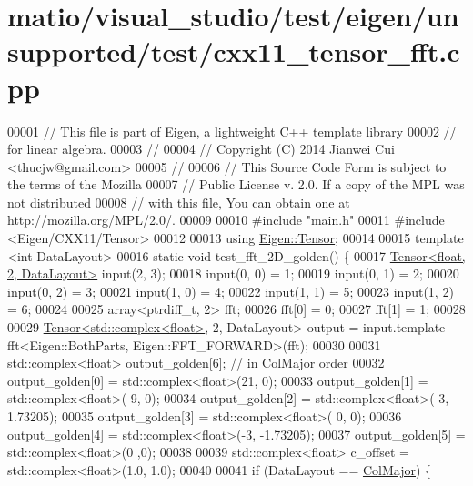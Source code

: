 \hypertarget{matio_2visual__studio_2test_2eigen_2unsupported_2test_2cxx11__tensor__fft_8cpp_source}{}\section{matio/visual\+\_\+studio/test/eigen/unsupported/test/cxx11\+\_\+tensor\+\_\+fft.cpp}
\label{matio_2visual__studio_2test_2eigen_2unsupported_2test_2cxx11__tensor__fft_8cpp_source}

\begin{DoxyCode}
00001 \textcolor{comment}{// This file is part of Eigen, a lightweight C++ template library}
00002 \textcolor{comment}{// for linear algebra.}
00003 \textcolor{comment}{//}
00004 \textcolor{comment}{// Copyright (C) 2014 Jianwei Cui <thucjw@gmail.com>}
00005 \textcolor{comment}{//}
00006 \textcolor{comment}{// This Source Code Form is subject to the terms of the Mozilla}
00007 \textcolor{comment}{// Public License v. 2.0. If a copy of the MPL was not distributed}
00008 \textcolor{comment}{// with this file, You can obtain one at http://mozilla.org/MPL/2.0/.}
00009 
00010 \textcolor{preprocessor}{#include "main.h"}
00011 \textcolor{preprocessor}{#include <Eigen/CXX11/Tensor>}
00012 
00013 \textcolor{keyword}{using} \hyperlink{class_eigen_1_1_tensor}{Eigen::Tensor};
00014 
00015 \textcolor{keyword}{template} <\textcolor{keywordtype}{int} DataLayout>
00016 \textcolor{keyword}{static} \textcolor{keywordtype}{void} test\_fft\_2D\_golden() \{
00017   \hyperlink{class_eigen_1_1_tensor}{Tensor<float, 2, DataLayout>} input(2, 3);
00018   input(0, 0) = 1;
00019   input(0, 1) = 2;
00020   input(0, 2) = 3;
00021   input(1, 0) = 4;
00022   input(1, 1) = 5;
00023   input(1, 2) = 6;
00024 
00025   array<ptrdiff\_t, 2> fft;
00026   fft[0] = 0;
00027   fft[1] = 1;
00028 
00029   \hyperlink{class_eigen_1_1_tensor}{Tensor<std::complex<float>}, 2, DataLayout> output = input.template 
      fft<Eigen::BothParts, Eigen::FFT\_FORWARD>(fft);
00030 
00031   std::complex<float> output\_golden[6]; \textcolor{comment}{// in ColMajor order}
00032   output\_golden[0] = std::complex<float>(21, 0);
00033   output\_golden[1] = std::complex<float>(-9, 0);
00034   output\_golden[2] = std::complex<float>(-3, 1.73205);
00035   output\_golden[3] = std::complex<float>( 0, 0);
00036   output\_golden[4] = std::complex<float>(-3, -1.73205);
00037   output\_golden[5] = std::complex<float>(0 ,0);
00038 
00039   std::complex<float> c\_offset = std::complex<float>(1.0, 1.0);
00040 
00041   \textcolor{keywordflow}{if} (DataLayout == \hyperlink{group__enums_ggaacded1a18ae58b0f554751f6cdf9eb13a0cbd4bdd0abcfc0224c5fcb5e4f6669a}{ColMajor}) \{

\end{DoxyCode}

